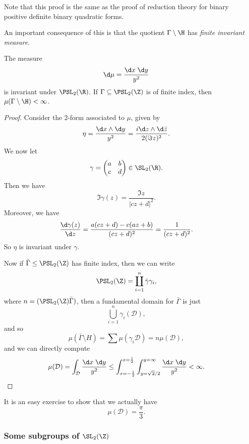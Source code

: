 \documentclass[a4paper]{article}
\begin{document}
Note that this proof is the same as the proof of reduction theory for binary positive definite binary quadratic forms.

An important consequence of this is that the quotient $\Gamma \setminus \H$ has \emph{finite invariant measure}.
\begin{prop}
  The measure
  \[
    \d \mu = \frac{\d x\;\d y}{y^2}
  \]
  is invariant under $\PSL_2(\R)$. If $\Gamma \subseteq \PSL_2(\Z)$ is of finite index, then $\mu(\Gamma\setminus \H) < \infty$.
\end{prop}

\begin{proof}
  Consider the $2$-form associated to $\mu$, given by
  \[
    \eta = \frac{\d x \wedge \d y}{y^2} = \frac{i \d z \wedge \d \bar{z}}{2 (\Im z)^2}.
  \]
  We now let
  \[
    \gamma =
    \begin{pmatrix}
      a & b\\
      c & d
    \end{pmatrix} \in \SL_2(\R).
  \]
  Then we have
  \[
    \Im \gamma(z) = \frac{\Im z}{|cz + d|^2}.
  \]
  Moreover, we have
  \[
    \frac{\d \gamma(z)}{\d z} = \frac{a(cz + d) - c(az + b)}{(cz + d)^2} = \frac{1}{(cz + d)^2}.
  \]
  So $\eta$ is invariant under $\gamma$.

  Now if $\bar\Gamma \leq \PSL_2(\Z)$ has finite index, then we can write
  \[
    \PSL_2(\Z) = \coprod_{i = 1}^n \bar\gamma \gamma_i,
  \]
  where $n = (\PSL_2(\Z) \bar\Gamma)$, then a fundamental domain for $\bar\Gamma$ is just
  \[
    \bigcup_{i = 1}^n  \gamma_i(\mathcal{D}),
  \]
  and so
  \[
    \mu(\bar\Gamma \setminus H) = \sum \mu(\gamma_i \mathcal{D}) = n \mu(\mathcal{D}),
  \]
  and we can directly compute
  \[
    \mu(\mathcal{D}) = \int_\mathcal{D} \frac{\d x\; \d y}{y^2} \leq \int_{x = -\frac{1}{2}}^{x = \frac{1}{2}}\int_{y = \sqrt{2}/2}^{y = \infty} \frac{\d x\;\d y}{y^2} < \infty.
  \]
\end{proof}
It is an easy exercise to show that we actually have
\[
  \mu(\mathcal{D}) = \frac{\pi}{3}.
\]
\subsubsection*{Some subgroups of \texorpdfstring{$\SL_2(\Z)$}{SL2(Z)}}
\end{document}
